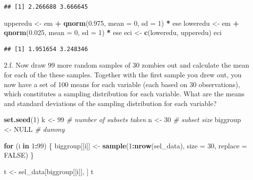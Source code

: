 \documentclass[]{article}
\newenvironment{Shaded}{\begin{snugshade}}{\end{snugshade}}
\newcommand{\KeywordTok}[1]{\textcolor[rgb]{0.13,0.29,0.53}{\textbf{#1}}}
\newcommand{\DataTypeTok}[1]{\textcolor[rgb]{0.13,0.29,0.53}{#1}}
\newcommand{\DecValTok}[1]{\textcolor[rgb]{0.00,0.00,0.81}{#1}}
\newcommand{\FloatTok}[1]{\textcolor[rgb]{0.00,0.00,0.81}{#1}}
\newcommand{\StringTok}[1]{\textcolor[rgb]{0.31,0.60,0.02}{#1}}
\newcommand{\CommentTok}[1]{\textcolor[rgb]{0.56,0.35,0.01}{\textit{#1}}}
\newcommand{\OtherTok}[1]{\textcolor[rgb]{0.56,0.35,0.01}{#1}}
\newcommand{\ControlFlowTok}[1]{\textcolor[rgb]{0.13,0.29,0.53}{\textbf{#1}}}
\newcommand{\OperatorTok}[1]{\textcolor[rgb]{0.81,0.36,0.00}{\textbf{#1}}}
\newcommand{\NormalTok}[1]{#1}
\begin{document}
\begin{verbatim}
## [1] 2.266688 3.666645
\end{verbatim}

\begin{Shaded}
\begin{Highlighting}[]
\NormalTok{upperedu <-}\StringTok{ }\NormalTok{em }\OperatorTok{+}\StringTok{ }\KeywordTok{qnorm}\NormalTok{(}\FloatTok{0.975}\NormalTok{, }\DataTypeTok{mean =} \DecValTok{0}\NormalTok{, }\DataTypeTok{sd =} \DecValTok{1}\NormalTok{) }\OperatorTok{*}\StringTok{ }\NormalTok{ese}
\NormalTok{loweredu <-}\StringTok{ }\NormalTok{em }\OperatorTok{+}\StringTok{ }\KeywordTok{qnorm}\NormalTok{(}\FloatTok{0.025}\NormalTok{, }\DataTypeTok{mean =} \DecValTok{0}\NormalTok{, }\DataTypeTok{sd =} \DecValTok{1}\NormalTok{) }\OperatorTok{*}\StringTok{ }\NormalTok{ese }
\NormalTok{eci <-}\StringTok{ }\KeywordTok{c}\NormalTok{(loweredu, upperedu)}
\NormalTok{eci}
\end{Highlighting}
\end{Shaded}

\begin{verbatim}
## [1] 1.951654 3.248346
\end{verbatim}

2.f. Now draw 99 more random samples of 30 zombies out and calculate the
mean for each of the these samples. Together with the first sample you
drew out, you now have a set of 100 means for each variable (each based
on 30 observations), which constitutes a sampling distribution for each
variable. What are the means and standard deviations of the sampling
distribution for each variable?

\begin{Shaded}
\begin{Highlighting}[]
\KeywordTok{set.seed}\NormalTok{(}\DecValTok{1}\NormalTok{)}
\NormalTok{k <-}\StringTok{ }\DecValTok{99}  \CommentTok{# number of subsets taken}
\NormalTok{n <-}\StringTok{ }\DecValTok{30}  \CommentTok{# subset size}
\NormalTok{biggroup <-}\StringTok{ }\OtherTok{NULL}  \CommentTok{# dummy}

\ControlFlowTok{for}\NormalTok{ (i }\ControlFlowTok{in} \DecValTok{1}\OperatorTok{:}\DecValTok{99}\NormalTok{) \{}
\NormalTok{  biggroup[[i]] <-}\StringTok{ }\KeywordTok{sample}\NormalTok{(}\DecValTok{1}\OperatorTok{:}\KeywordTok{nrow}\NormalTok{(sel_data), }\DataTypeTok{size =} \DecValTok{30}\NormalTok{, }\DataTypeTok{replace =} \OtherTok{FALSE}\NormalTok{)}
\NormalTok{\}}

\NormalTok{t <-}\StringTok{ }\NormalTok{sel_data[biggroup[[i]], ]}
\NormalTok{t}
\end{Highlighting}
\end{Shaded}
\end{document}

